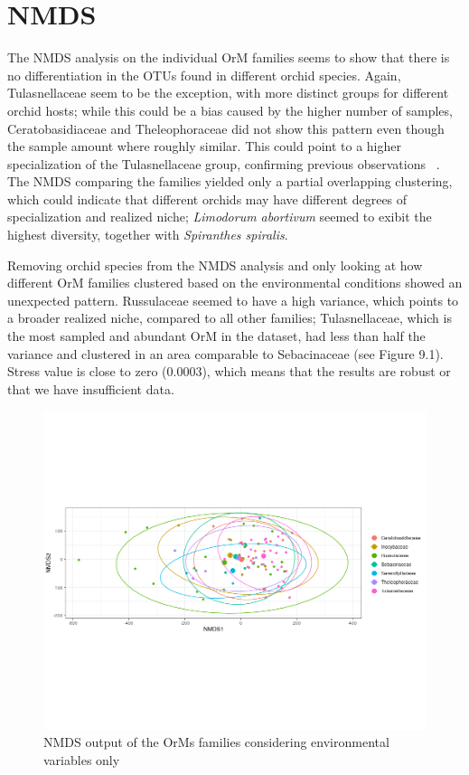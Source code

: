 \chapter{NMDS}
\label{nmds}

The NMDS analysis on the individual OrM families seems to show that there is no differentiation in the OTUs found in different orchid species.
Again, Tulasnellaceae seem to be the exception, with more distinct groups for different orchid hosts; while this could be a bias caused by the higher number of samples, Ceratobasidiaceae and Theleophoraceae did not show this pattern even though the sample amount where roughly similar. This could point to a higher specialization of the Tulasnellaceae group, confirming previous observations ~\citep{dearnaley2007}.
The NMDS comparing the families yielded only a partial overlapping clustering, which could indicate that different orchids may have different degrees of specialization and realized niche; \emph{Limodorum abortivum} seemed to exibit the highest diversity, together with \emph{Spiranthes spiralis}.

Removing orchid species from the NMDS analysis and only looking at how different OrM families clustered based on the environmental conditions showed an unexpected pattern. Russulaceae seemed to have a high variance, which points to a broader realized niche, compared to all other families; Tulasnellaceae, which is the most sampled and abundant OrM in the dataset, had less than half the variance and clustered in an area comparable to Sebacinaceae (see Figure 9.1). Stress value is close to zero (0.0003), which means that the results are robust or that we have insufficient data.

\begin{figure}[htbp]
\centering
\includegraphics[keepaspectratio,width=\textwidth,height=0.75\textheight]{images/nmdsEnvMatrix.png}
\caption{NMDS output of the OrMs families considering environmental variables only}
\end{figure}

